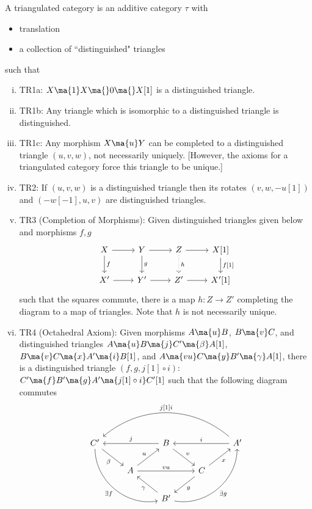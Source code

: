 \begin{dfn}
A triangulated category is an additive category $\tau$ with 
\begin{itemize}
\item translation
\item a collection of ``distinguished" triangles
\end{itemize}
such that 
\begin{enumerate}[(i)]
\item TR1a: $X \ma{1} X \ma{} 0 \ma{} X[1]$ is a distinguished triangle. 
\item TR1b: Any triangle which is isomorphic to a distinguished triangle is distinguished. 
\item TR1c: Any morphism $X \ma{u} Y$ can be completed to a distinguished triangle $(u,v,w)$, not necessarily uniquely. [However, the axioms for a triangulated category force this triangle to be unique.]
\item TR2: If $(u,v,w)$ is a distinguished triangle then its rotates $(v,w,-u[1])$ and $(-w[-1],u,v)$ are distinguished triangles.
\item TR3 (Completion of Morphisms): Given distinguished triangles given below and morphisms $f,g$
\[
\begin{tikzcd}
X \arrow{r} \arrow{d}{f} & Y \arrow{r} \arrow{d}{g} & Z \arrow{r} \arrow[dotted]{d}{h} & X[1] \arrow{d}{f[1]} \\
X' \arrow{r} & Y' \arrow{r} & Z' \arrow{r} & X'[1]
\end{tikzcd}
\]
such that the squares commute, there is a map $h: Z \to Z'$ completing the diagram to a map of triangles. Note that $h$ is not necessarily unique. 
\item TR4 (Octahedral Axiom): Given morphisms $A \ma{u} B$, $B \ma{v} C$, and distinguished triangles $A \ma{u} B \ma{j} C' \ma{\beta} A[1]$, $B \ma{v} C \ma{x} A' \ma{i} B[1]$, and $A \ma{vu} C \ma{y} B' \ma{\gamma} A[1]$, there is a distinguished triangle $(f,g,j[1] \circ i)$: $C' \ma{f} B' \ma{g} A' \ma{j[1] \circ i} C'[1]$ such that the following diagram commutes
\[
\begin{tikzcd}
C' \arrow[bend right=50,swap]{ddrr}{\exists f} \arrow[swap]{dr}{\beta} & & B \arrow[swap]{ll}{j} \arrow{dr}{v} & & A' \arrow[swap]{ll}{i} \arrow[bend right=40,swap]{llll}{j[1]i} \\
 & A \arrow{ur}{u} \arrow{rr}{vu} &  & C \arrow[swap]{ur}{x} \arrow{dl}{y} &  \\
 & & B' \arrow{ul}{\gamma} \arrow[bend right=50,swap]{rruu}{\exists g} & &  \\
\end{tikzcd}
\]
\end{enumerate}
\end{dfn}

